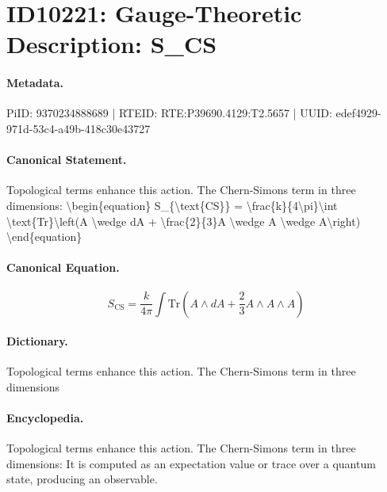 \section*{ID10221: Gauge-Theoretic Description: S\_CS}
\paragraph{Metadata.}
PiID: 9370234888689 | RTEID: RTE:P39690.4129:T2.5657 | UUID: edef4929-971d-53c4-a49b-418c30e43727

\paragraph{Canonical Statement.}
Topological terms enhance this action. The Chern-Simons term in three dimensions: \textbackslash{}begin\{equation\} S\_\{\textbackslash{}text\{CS\}\} = \textbackslash{}frac\{k\}\{4\textbackslash{}pi\}\textbackslash{}int \textbackslash{}text\{Tr\}\textbackslash{}left(A \textbackslash{}wedge dA + \textbackslash{}frac\{2\}\{3\}A \textbackslash{}wedge A \textbackslash{}wedge A\textbackslash{}right) \textbackslash{}end\{equation\}

\paragraph{Canonical Equation.}
\[
S_{\text{CS}} = \frac{k}{4\pi}\int \text{Tr}\left(A \wedge dA + \frac{2}{3}A \wedge A \wedge A\right)
\]

\paragraph{Dictionary.}
Topological terms enhance this action. The Chern-Simons term in three dimensions

\paragraph{Encyclopedia.}
Topological terms enhance this action. The Chern-Simons term in three dimensions: It is computed as an expectation value or trace over a quantum state, producing an observable.
